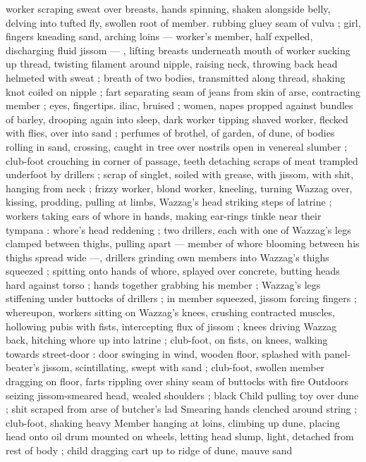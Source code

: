 worker scraping sweat over breasts, hands spinning, shaken 
alongside belly, delving into tufted fly, swollen root of member. 
rubbing gluey seam of vulva ; girl, fingers kneading sand, arching 
loins --- worker's member, half expelled, discharging fluid jissom --- 
, lifting breasts underneath mouth of worker sucking up thread, 
twisting filament around nipple, raising neck, throwing back head 
helmeted with sweat ; breath of two bodies, transmitted along 
thread, shaking knot coiled on nipple ; fart separating seam of jeans 
from skin of arse, contracting member ; eyes, fingertips. iliac, 
bruised ; women, napes propped against bundles of barley, drooping 
again into sleep, dark worker tipping shaved worker, flecked with 
flies, over into sand ; perfumes of brothel, of garden, of dune, of 
bodies rolling in sand, crossing, caught in tree over nostrils open in 
venereal slumber ; club-foot crouching in corner of passage, teeth 
detaching scraps of meat trampled underfoot by drillers ; scrap of 
singlet, soiled with grease, with jissom, with shit, hanging from neck 
; frizzy worker, blond worker, kneeling, turning Wazzag over, kissing, 
prodding, pulling at limbs, Wazzag's head striking steps of latrine ; 
workers taking ears of whore in hands, making ear-rings tinkle near 
their tympana : whore's head reddening ; two drillers, each with one 
of Wazzag's legs clamped between thighs, pulling apart --- member 
of whore blooming between his thighs spread wide ---, drillers 
grinding own members into Wazzag's thighs squeezed ; spitting onto 
hands of whore, splayed over concrete, butting heads hard against 
torso ; hands together grabbing his member ; Wazzag's legs 
stiffening under buttocks of drillers ; in member squeezed, jissom 
forcing fingers ; whereupon, workers sitting on Wazzag's knees, 
crushing contracted muscles, hollowing pubis with fists, intercepting 
flux of jissom ; knees driving Wazzag back, hitching whore up into 
latrine ; club-foot, on fists, on knees, walking towards street-door : 
door swinging in wind, wooden floor, splashed with panel-beater's 
jissom, scintillating, swept with sand ; club-foot, swollen member 
dragging on floor, farts rippling over shiny seam of buttocks with fire 
Outdoors seizing jissom-smeared head, wealed shoulders ; black 
Child pulling toy over dune ; shit scraped from arse of butcher's lad 
Smearing hands clenched around string ; club-foot, shaking heavy 
Member hanging at loins, climbing up dune, placing head onto oil 
drum mounted on wheels, letting head slump, light, detached from 
rest of body ; child dragging cart up to ridge of dune, mauve sand 
